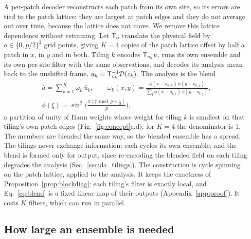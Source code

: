 A per-patch decoder reconstructs each patch from its own site, so its
errors are tied to the patch lattice: they are largest at patch edges and
they do not average out over time, because the lattice does not move. We
remove this lattice dependence without retraining. Let $\mathsf{T}_o$ translate
the physical field by $o\in\{0,p/2\}^2$ grid points, giving $K=4$ copies
of the patch lattice offset by half a patch in $x$, in $y$ and in both.
Tiling $k$ encodes $\mathsf{T}_{o_k}u$, runs its own ensemble and its own
per-site filter with the same observations, and decodes its analysis mean
back to the unshifted frame, $\bar u_k = \mathsf{T}_{o_k}^{-1}\mathcal{D}(\bar z_k)$. The
analysis is the blend
\begin{equation}
\begin{gathered}
  \bar u = \sum_{k=1}^{K} \omega_k\,\bar u_k,\qquad
  \omega_k(x,y) = \frac{\phi(x-o_{k,x})\,\phi(y-o_{k,y})}
  {\sum_{l}\phi(x-o_{l,x})\,\phi(y-o_{l,y})},\\
  \phi(\xi) = \sin^2\!\Big(\frac{\pi(\xi \bmod p + \tfrac12)}{p}\Big),
\end{gathered}
  \label{eq:blend}
\end{equation}
a partition of unity of Hann weights whose weight for tiling $k$ is smallest on that
tiling's own patch edges (Fig.~\ref{fig:concept}c,d); for $K=4$ the
denominator is $1$. The members are blended the same way, so the blended
ensemble has a spread. The tilings never exchange information: each
cycles its own ensemble, and the blend is formed only for output, since
re-encoding the blended field on each tiling degrades the analysis
(Sec.~\ref{sec:da_tilings}). The construction is cycle spinning
\citep{coifmandonoho1995} on the patch lattice, applied to the analysis.
It keeps the exactness of Proposition~\ref{prop:blockdiag}: each tiling's
filter is exactly local, and Eq.~\eqref{eq:blend} is a fixed linear map of
their outputs (Appendix~\ref{app:proof}). It costs $K$ filters, which can
run in parallel.

\subsection{How large an ensemble is needed}
\label{sec:nens}

